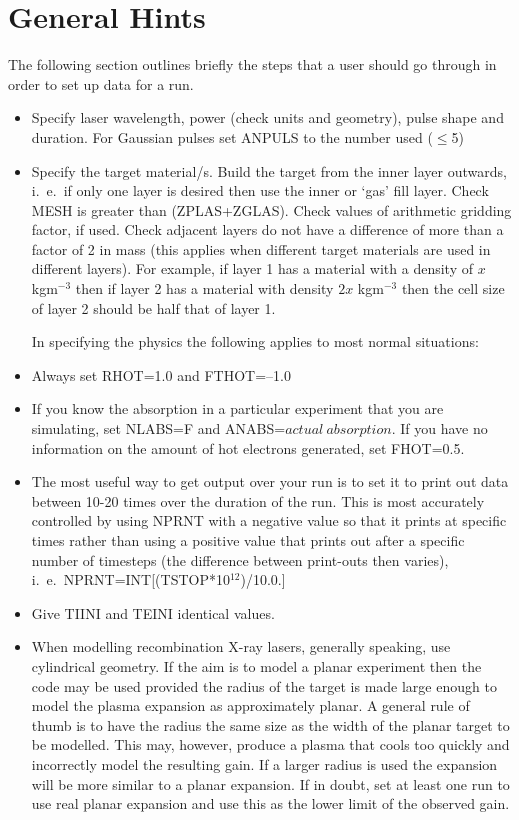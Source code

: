 \newpage 
\section{General Hints}
The following section outlines briefly the steps that a user should
go through in order to set up data for a run.
\begin{itemize}
\item Specify laser wavelength, power (check units and geometry),
pulse shape
and duration. For Gaussian pulses set ANPULS to the number used ($\le$5)
\item Specify the target material/s. Build the target from the inner
layer outwards, i.\ e.\ if only one layer is desired then use the inner
or `gas' fill layer. Check MESH is greater than (ZPLAS+ZGLAS).
Check values of arithmetic gridding factor, if used. Check adjacent
layers do not have a difference of more than a factor of 2 in mass
(this applies when different target
materials are used in different layers).
For example, if layer 1 has a material with a density of $x$ kgm$^{-3}$
then if layer 2 has a material with density $2x$ kgm$^{-3}$ then the cell
size of layer 2 should be half that of layer 1.
 
In specifying the physics the following applies to most
normal situations:
\item Always set RHOT=1.0 and FTHOT=--1.0
\item If you know the absorption in a particular experiment that you are
simulating, set NLABS=F and ANABS=$actual\ absorption$. If you have no
information on the amount of hot electrons generated, set FHOT=0.5.
\item The most useful way to get output over your run is to set
it to print out data between 10-20 times over the duration of the run.
This is most accurately controlled by using NPRNT with a negative value
so that it prints at specific times
rather than using a positive value that
prints out after a specific number of timesteps (the difference between
print-outs then varies), i.\ e.\ NPRNT=INT[(TSTOP*10$^{12}$)/10.0.]
\item Give TIINI and TEINI identical values.
\item When modelling recombination X-ray lasers, generally speaking, use cylindrical
geometry. If the aim is to model a planar experiment then the code may be
used provided the radius of the target is made large enough to model
the plasma expansion as approximately planar. A general rule of thumb
is to have the radius the same size as the width of the planar target to
be modelled. This may, however, produce a plasma that cools too quickly
and incorrectly model the resulting gain. If a larger radius is used the
expansion will be more similar to a planar expansion. If in doubt,
set at least one run to use real planar expansion and use this as the
lower limit of the observed gain.
\end{itemize}
 
